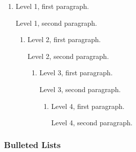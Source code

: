 \documentclass{article}
\begin{document}
\begin{enumerate}
\item Level 1, first paragraph.

Level 1, second paragraph.

\begin{enumerate}
\item Level 2, first paragraph.

Level 2, second paragraph.

\begin{enumerate}
\item Level 3, first paragraph.

Level 3, second paragraph.

\begin{enumerate}
\item Level 4, first paragraph.

Level 4, second paragraph.
\end{enumerate}
\end{enumerate}
\end{enumerate}
\end{enumerate}

\subsubsection{Bulleted Lists}
\end{document}
